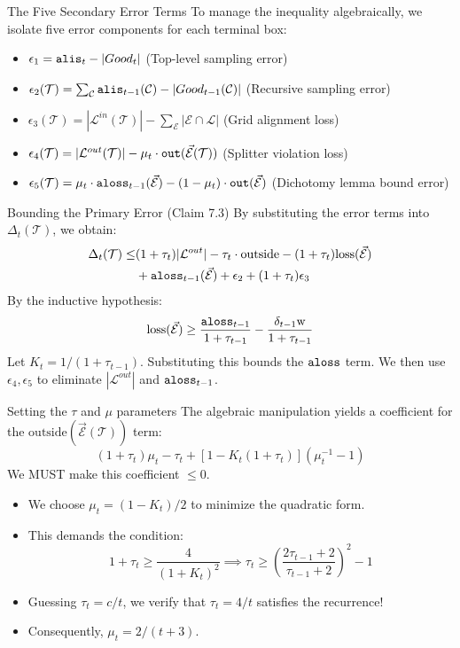 \documentclass[11pt,aspectratio=169]{beamer}
\newcommand{\alis}{{\tt alis}}
\newcommand{\aloss}{{\tt aloss}}
\newcommand{\outside}{{\tt out}}
\newcommand{\width}{{\bf {\rm  w}}}
\begin{document}
\begin{frame}{The Five Secondary Error Terms}
    To manage the inequality algebraically, we isolate five error components for each terminal box:
    \begin{itemize}
        \item $\epsilon_1 = \alis_t - |Good_t|$ (Top-level sampling error)
        \item $\epsilon_2(\mathcal{T}) = \sum_{\mathcal{C}} \alis_{t-1}(\mathcal{C}) - |Good_{t-1}(\mathcal{C})|$ (Recursive sampling error)
        \item $\epsilon_3(\mathcal{T}) = |\mathcal{L}^{in}(\mathcal{T})| - \sum_{\mathcal{E}} |\mathcal{E} \cap \mathcal{L}|$ (Grid alignment loss)
        \item $\epsilon_4(\mathcal{T}) = |\mathcal{L}^{out}(\mathcal{T})| - \mu_t \cdot \outside(\vec{\mathcal{E}}(\mathcal{T}))$ (Splitter violation loss)
        \item $\epsilon_5(\mathcal{T}) = \mu_t \cdot \aloss_{t-1}(\vec{\mathcal{E}}) - (1-\mu_t)\cdot \outside(\vec{\mathcal{E}})$ (Dichotomy lemma bound error)
    \end{itemize}
\end{frame}

\begin{frame}{Bounding the Primary Error (Claim 7.3)}
    By substituting the error terms into $\Delta_t(\mathcal{T})$, we obtain:
    \begin{align*}
        \Delta_t(\mathcal{T}) \leq &(1+\tau_t)|\mathcal{L}^{out}| - \tau_t \cdot \text{outside} - (1+\tau_t)\text{loss}(\vec{\mathcal{E}}) \\
        &+ \aloss_{t-1}(\vec{\mathcal{E}}) + \epsilon_2 + (1+\tau_t)\epsilon_3
    \end{align*}
    By the inductive hypothesis:
    $$\text{loss}(\vec{\mathcal{E}}) \geq \frac{\aloss_{t-1}}{1+\tau_{t-1}} - \frac{\delta_{t-1}\width}{1+\tau_{t-1}}$$
    Let $K_t = 1/(1+\tau_{t-1})$. Substituting this bounds the $\aloss$ term. We then use $\epsilon_4, \epsilon_5$ to eliminate $|\mathcal{L}^{out}|$ and $\aloss_{t-1}$.
\end{frame}

\begin{frame}{Setting the $\tau$ and $\mu$ parameters}
    The algebraic manipulation yields a coefficient for the $\text{outside}(\vec{\mathcal{E}}(\mathcal{T}))$ term:
    $$(1+\tau_t)\mu_t - \tau_t + [1 - K_t(1+\tau_t)](\mu_t^{-1} - 1)$$
    We MUST make this coefficient $\leq 0$. 
    
    \begin{itemize}
        \item We choose $\mu_t = (1-K_t)/2$ to minimize the quadratic form.
        \item This demands the condition:
        $$1 + \tau_t \geq \frac{4}{(1+K_t)^2} \implies \tau_t \geq \left( \frac{2\tau_{t-1} + 2}{\tau_{t-1} + 2} \right)^2 - 1$$
        \item Guessing $\tau_t = c/t$, we verify that $\tau_t = 4/t$ satisfies the recurrence! 
        \item Consequently, $\mu_t = 2/(t+3)$.
    \end{itemize}
\end{frame}
\end{document}

